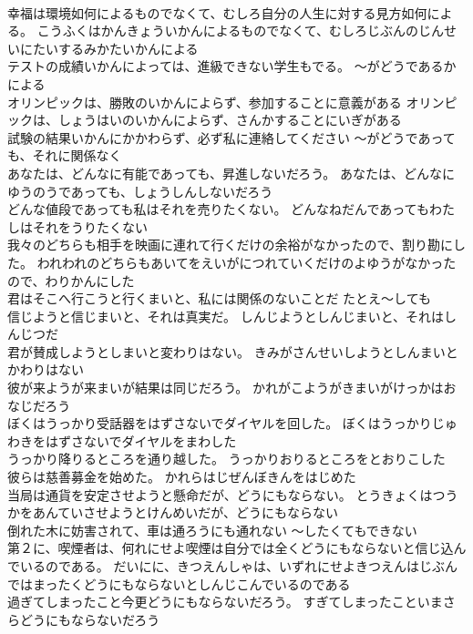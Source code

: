 \documentclass[8pt]{extreport}
\begin{document}
\begin{CJK}{UTF8}{min}
\\	幸福は環境如何によるものでなくて、むしろ自分の人生に対する見方如何による。	こうふくはかんきょういかんによるものでなくて、むしろじぶんのじんせいにたいするみかたいかんによる 
\\	テストの成績いかんによっては、進級できない学生もでる。	～がどうであるかによる
\\	オリンピックは、勝敗のいかんによらず、参加することに意義がある	オリンピックは、しょうはいのいかんによらず、さんかすることにいぎがある 
\\	試験の結果いかんにかかわらず、必ず私に連絡してください	～がどうであっても、それに関係なく
\\	あなたは、どんなに有能であっても、昇進しないだろう。	あなたは、どんなにゆうのうであっても、しょうしんしないだろう 
\\	どんな値段であっても私はそれを売りたくない。	どんなねだんであってもわたしはそれをうりたくない 
\\	我々のどちらも相手を映画に連れて行くだけの余裕がなかったので、割り勘にした。	われわれのどちらもあいてをえいがにつれていくだけのよゆうがなかったので、わりかんにした 
\\	君はそこへ行こうと行くまいと、私には関係のないことだ	たとえ～しても
\\	信じようと信じまいと、それは真実だ。	しんじようとしんじまいと、それはしんじつだ 
\\	君が賛成しようとしまいと変わりはない。	きみがさんせいしようとしんまいとかわりはない 
\\	彼が来ようが来まいが結果は同じだろう。	かれがこようがきまいがけっかはおなじだろう 
\\	ぼくはうっかり受話器をはずさないでダイヤルを回した。	ぼくはうっかりじゅわきをはずさないでダイヤルをまわした 
\\	うっかり降りるところを通り越した。	うっかりおりるところをとおりこした 
\\	彼らは慈善募金を始めた。	かれらはじぜんぼきんをはじめた 
\\	当局は通貨を安定させようと懸命だが、どうにもならない。	とうきょくはつうかをあんていさせようとけんめいだが、どうにもならない 
\\	倒れた木に妨害されて、車は通ろうにも通れない	～したくてもできない
\\	第２に、喫煙者は、何れにせよ喫煙は自分では全くどうにもならないと信じ込んでいるのである。	だいにに、きつえんしゃは、いずれにせよきつえんはじぶんではまったくどうにもならないとしんじこんでいるのである 
\\	過ぎてしまったこと今更どうにもならないだろう。	すぎてしまったこといまさらどうにもならないだろう 

\end{CJK}
\end{document}
